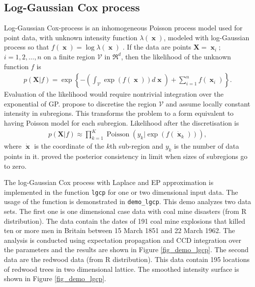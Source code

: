 \documentclass[twoside,11pt]{article}
\DeclareMathOperator{\x}{\mathbf{x}}
\DeclareMathOperator{\Poisson}{Poisson}
\newcommand{\mb}{\mathbf}
\newcommand{\code}[1]{{\normalfont\texttt{#1}}}
\begin{document}
%
\subsection{Log-Gaussian Cox process}

Log-Gaussian Cox-process is an inhomogeneous Poisson process model
used for point data, with unknown intensity function $\lambda(\x)$,
modeled with log-Gaussian process so that $f(\x)=\log \lambda(\x)$
\citep[see][]{Rathbun+Cressie:1994,Moller+Syversveen+Waagepetersen:1998}.
%
If the data are points $\mb{X}=\x_i;$ $i=1,2,\ldots,n$ on a finite region
$\mathcal{V}$ in $\Re^d$, then the likelihood of the unknown
function $f$ is
\begin{align}
  p(\mb{X}|f)=\exp\left\{-\left(\int_{\mathcal{V}} \exp(f(\x)) d\x
\right)+\sum_{i=1}^{n} f(\x_i) \right\}.
\end{align}
Evaluation of the likelihood would require nontrivial integration over
the exponential of GP.  \citet{Moller+Syversveen+Waagepetersen:1998}
propose to discretise the region $\mathcal{V}$ and assume locally
constant intensity in subregions. This transforms the problem to a
form equivalent to having Poisson model for each subregion. Likelihood
after the discretisation is
\begin{align}
  p(\mb{X}|f)\approx \prod_{k=1}^K \Poisson(y_k|\exp(f(\dot{\x}_k))),
\end{align}
where $\dot{\x}$ is the coordinate of the $k$th sub-region and $y_k$
is the number of data points in it. \citet{Tokdar+Ghosh:2007} proved
the posterior consistency in limit when sizes of subregions go to
zero.

The log-Gaussian Cox process with Laplace and EP approximation is
implemented in the function \code{lgcp} for one or two dimensional
input data. The usage of the function is demonstrated in
\code{demo\_lgcp}. This demo analyzes two data sets.  The first one is
one dimensional case data with coal mine disasters (from R
distribution). The data contain the dates of 191 coal mine explosions
that killed ten or more men in Britain between 15 March 1851 and 22
March 1962. The analysis is conducted using expectation propagation
and CCD integration over the parameters and the results are shown
in Figure \ref{fig_demo_lgcp}. The second data are the redwood data
(from R distribution). This data contain 195 locations of redwood
trees in two dimensional lattice. The smoothed intensity surface is
shown in Figure \ref{fig_demo_lgcp}.
\end{document}
